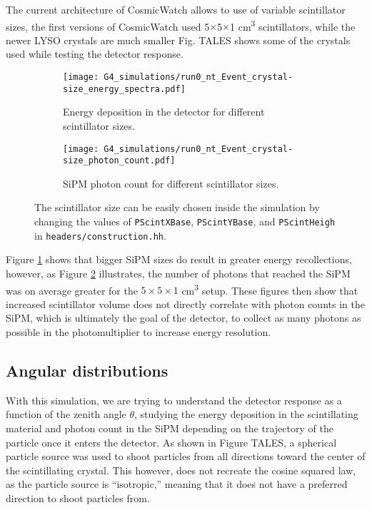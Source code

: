 The current architecture of CosmicWatch allows to use of variable scintillator sizes, the first versions of CosmicWatch used 5$\times$5$\times$1 \unit{\cm\cubed} scintillators, while the newer LYSO crystals are much smaller Fig. TALES shows some of the crystals used while testing the detector response.

\begin{figure}[H]
  \centering
  \begin{subfigure}[t]{0.48\textwidth}
    \texttt{[image: G4\_simulations/run0\_nt\_Event\_crystal-size\_energy\_spectra.pdf]}
    \caption{\label{sfig:scint_size_edep}Energy deposition in the detector for different scintillator sizes.}
  \end{subfigure}
  \hfill
  \begin{subfigure}[t]{0.48\textwidth}
    \texttt{[image: G4\_simulations/run0\_nt\_Event\_crystal-size\_photon\_count.pdf]}
    \caption{\label{sfig:scint_size_pcount}SiPM photon count for different scintillator sizes.}
  \end{subfigure}
  \caption{\label{fig:scint_size_results}The scintillator size can be easily chosen inside the simulation by changing the values of \texttt{PScintXBase}, \texttt{PScintYBase}, and \texttt{PScintHeigh} in \texttt{headers/construction.hh}.}
\end{figure}

Figure \ref{sfig:scint_size_edep} shows that bigger SiPM sizes do result in greater energy recollections, however, as Figure \ref{sfig:scint_size_pcount} illustrates, the number of photons that reached the SiPM was on average greater for the $5\times5\times1$ \unit{\cm\cubed} setup. These figures then show that increased scintillator volume does not directly correlate with photon counts in the SiPM, which is ultimately the goal of the detector, to collect as many photons as possible in the photomultiplier to increase energy resolution.

\subsection{Angular distributions}\label{sec:cos_squared}

With this simulation, we are trying to understand the detector response as a function of the zenith angle $\theta$, studying the energy deposition in the scintillating material and photon count in the SiPM depending on the trajectory of the particle once it enters the detector. As shown in Figure TALES, a spherical particle source was used to shoot particles from all directions toward the center of the scintillating crystal. This however, does not recreate the cosine squared law, as the particle source is ``isotropic,'' meaning that it does not have a preferred direction to shoot particles from.

